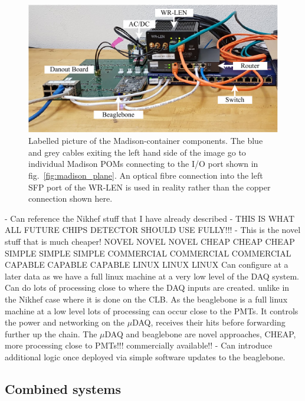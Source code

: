 \begin{figure} %
    \includegraphics[width=\textwidth]{diagrams/5-daq/madison_box.pdf}
    \caption[Labelled picture of the Madison-container components.]
    {Labelled picture of the Madison-container components. The blue and grey cables exiting the
        left hand side of the image go to individual Madison POMs connecting to the I/O port shown
        in fig.~\ref{fig:madison_plane}. An optical fibre connection into the left SFP port of the
        WR-LEN is used in reality rather than the copper connection shown here.}
    \label{fig:madison_box}
\end{figure}

- Can reference the Nikhef stuff that I have already described - THIS IS WHAT ALL FUTURE CHIPS
DETECTOR SHOULD USE FULLY!!! - This is the novel stuff that is much cheaper! NOVEL NOVEL NOVEL
CHEAP CHEAP CHEAP SIMPLE SIMPLE SIMPLE COMMERCIAL COMMERCIAL COMMERCIAL CAPABLE CAPABLE CAPABLE
LINUX LINUX LINUX Can configure at a later data as we have a full linux machine at a very low
level of the DAQ system. Can do lots of processing close to where the DAQ inputs are created.
unlike in the Nikhef case where it is done on the CLB. As the beaglebone is a full linux machine
at a low level lots of processing can occur close to the PMTs. It controls the power and
networking on the $\mu$DAQ, receives their hits before forwarding further up the chain. The
$\mu$DAQ and beaglebone are novel approaches, CHEAP, more processing close to PMTs!!! commercially
available!! - Can introduce additional logic once deployed via simple software updates to the
beaglebone.

\subsection{Combined systems} %
\label{sec:daq_hard_combined} %

